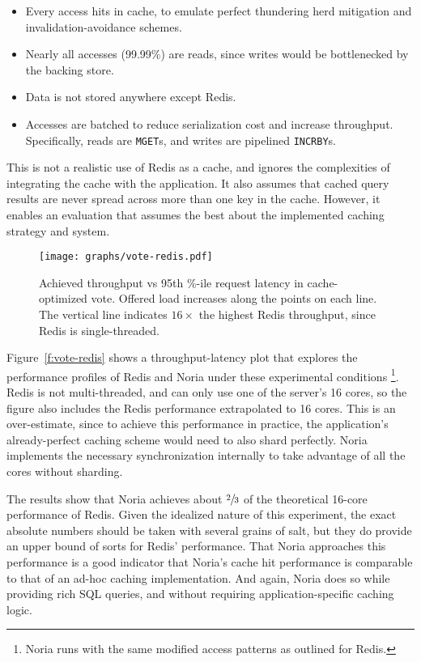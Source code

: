 \begin{itemize}
 \item Every access hits in cache, to emulate perfect thundering herd mitigation
   and invalidation-avoidance schemes.
 \item Nearly all accesses (99.99\%) are reads, since writes would be
   bottlenecked by the backing store.
 \item Data is not stored anywhere except Redis.
 \item Accesses are batched to reduce serialization cost and increase
   throughput. Specifically, reads are \texttt{MGET}s, and writes are pipelined
    \texttt{INCRBY}s.
\end{itemize}

This is not a realistic use of Redis as a cache, and ignores the complexities of
integrating the cache with the application. It also assumes that cached query
results are never spread across more than one key in the cache. However, it
enables an evaluation that assumes the best about the implemented caching
strategy and system.

\begin{figure}[h]
  \centering
  \texttt{[image: graphs/vote-redis.pdf]}
  \caption{Achieved throughput vs 95th \%-ile request latency in cache-optimized
  vote. Offered load increases along the points on each line. The vertical
  line indicates $16\times$ the highest Redis throughput, since Redis is
  single-threaded.}
  \label{f:vote-redis}
\end{figure}

Figure~\vref{f:vote-redis} shows a throughput-latency plot that explores the
performance profiles of Redis and Noria under these experimental conditions%
\footnote{Noria runs with the same modified access patterns as outlined for
Redis.}.
Redis is not multi-threaded, and can only use one of the server's 16 cores, so
the figure also includes the Redis performance extrapolated to 16 cores. This is
an over-estimate, since to achieve this performance in practice, the
application's already-perfect caching scheme would need to also shard perfectly.
Noria implements the necessary synchronization internally to take advantage of
all the cores without sharding.

The results show that Noria achieves about $\sfrac{2}{3}$ of the theoretical
16-core performance of Redis. Given the idealized nature of this experiment, the
exact absolute numbers should be taken with several grains of salt, but they do
provide an upper bound of sorts for Redis' performance. That Noria approaches
this performance is a good indicator that Noria's cache hit performance is
comparable to that of an ad-hoc caching implementation. And again, Noria does so
while providing rich SQL queries, and without requiring application-specific
caching logic.

